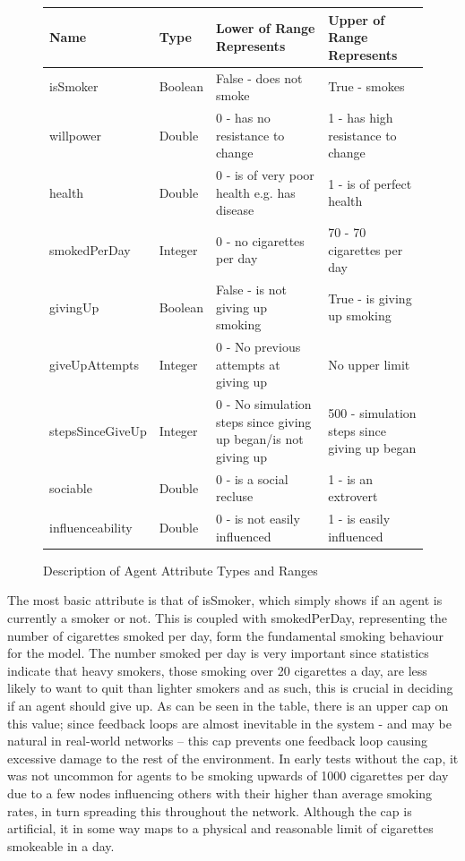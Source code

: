 \documentclass[]{report}
\begin{document}
\begin{figure}
\begin{center}
\label{tab:attr}
\begin{tabular}{|l||l|p{5cm}|p{5cm}|}
\hline
\bf{Name} & \bf{Type} & \bf{Lower of Range Represents} & \bf{Upper of Range Represents} \\
\hline
isSmoker 					& Boolean & False - does not smoke											& True - smokes \\
willpower					&	Double	&	0 - has no resistance to change							& 1 - has high resistance to change \\
health						&	Double	&	0 - is of very poor health e.g. has disease &	1 - is of perfect health \\
smokedPerDay			&	Integer	&	0 - no cigarettes per day										& 70 - 70 cigarettes per day \\
givingUp					&	Boolean	&	False - is not giving up smoking						& True - is giving up smoking \\
giveUpAttempts		&	Integer	&	0 - No previous attempts at giving up				& No upper limit \\
stepsSinceGiveUp	&	Integer	&	0 - No simulation steps since giving up began/is not giving up	& 500 - simulation steps since giving up began \\
sociable					&	Double	&	0 - is a social recluse											& 1	- is an extrovert \\
influenceability	&	Double	&	0 - is not easily influenced								& 1 - is easily influenced \\
\hline

\end{tabular}
\end{center}
\caption{Description of Agent Attribute Types and Ranges}
\end{figure}


The most basic attribute is that of isSmoker, which simply shows if an agent is currently a smoker or not. This is coupled with smokedPerDay, representing the number of cigarettes smoked per day, form the fundamental smoking behaviour for the model. The number smoked per day is very important since statistics indicate that heavy smokers, those smoking over 20 cigarettes a day, are less likely to want to quit than lighter smokers \cite{NHS-43} and as such, this is crucial in deciding if an agent should give up. As can be seen in the table, there is an upper cap on this value; since feedback loops are almost inevitable in the system  - and may be natural in real-world networks – this cap prevents one feedback loop causing excessive damage to the rest of the environment. In early tests without the cap, it was not uncommon for agents to be smoking upwards of 1000 cigarettes per day due to a few nodes influencing others with their higher than average smoking rates, in turn spreading this throughout the network. Although the cap is artificial, it in some way maps to a physical and reasonable limit of cigarettes smokeable in a day.
\end{document}
